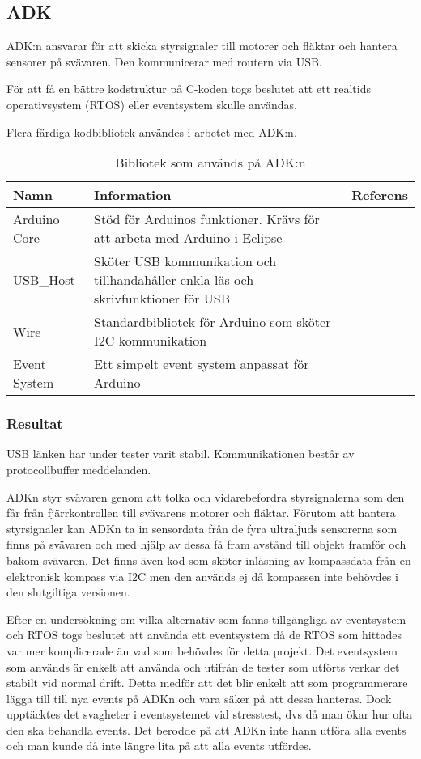\subsection{ADK}
ADK:n ansvarar för att skicka styrsignaler till motorer och fläktar och hantera sensorer på svävaren. 
Den kommunicerar med routern via USB.

För att få en bättre kodstruktur på C-koden togs beslutet att ett realtids operativsystem (RTOS) 
eller eventsystem skulle användas.

Flera färdiga kodbibliotek användes i arbetet med ADK:n. 

\begin{table}[htb]
\centering
\caption{Bibliotek som används på ADK:n}
\label{tbl:BOM}
\begin{tabular}{|l|p{}|c|}
\hline
\textbf{Namn} & \textbf{Information} & \textbf{Referens} \\
\hline
Arduino Core & Stöd för Arduinos funktioner. Krävs för att arbeta med Arduino i Eclipse &  \cite{Delta_BFB1212VH-R00}\\ 
\hline
USB\_Host & Sköter USB kommunikation och tillhandahåller enkla läs och skrivfunktioner för USB & \cite{USBHost}\\
\hline
Wire & Standardbibliotek för Arduino som sköter I2C kommunikation &  \cite{Wire}\\
\hline
Event System & Ett simpelt event system anpassat för Arduino & \cite{Eventsystem} \\
\hline
\end{tabular}	
\end{table}

\subsubsection{Resultat}
USB länken har under tester varit stabil.
Kommunikationen består av protocollbuffer meddelanden.

ADKn styr svävaren genom att tolka och vidarebefordra styrsignalerna 
som den får från fjärrkontrollen till svävarens motorer och fläktar. 
Förutom att hantera styrsignaler kan ADKn ta in sensordata från de fyra ultraljuds 
sensorerna som finns på svävaren och med hjälp av dessa få fram avstånd till objekt framför och bakom svävaren.
Det finns även kod som sköter inläsning av kompassdata från en elektronisk kompass \cite{kompass} via I2C men den 
används ej då kompassen inte behövdes i den slutgiltiga versionen.

Efter en undersökning om vilka alternativ som fanns tillgängliga av eventsystem och RTOS togs beslutet 
att använda ett eventsystem då de RTOS som hittades var mer komplicerade än vad som behövdes för detta projekt.
Det eventsystem som används är enkelt att använda och utifrån de tester som utförts verkar det stabilt vid normal drift. 
Detta medför att det blir enkelt att som programmerare lägga till till nya events på ADKn och 
vara säker på att dessa hanteras. 
Dock upptäcktes det svagheter i eventsystemet vid stresstest, dvs då man ökar hur ofta den ska behandla events. 
Det berodde på att ADKn inte hann utföra alla events och man kunde då inte längre lita på att alla events utfördes.

